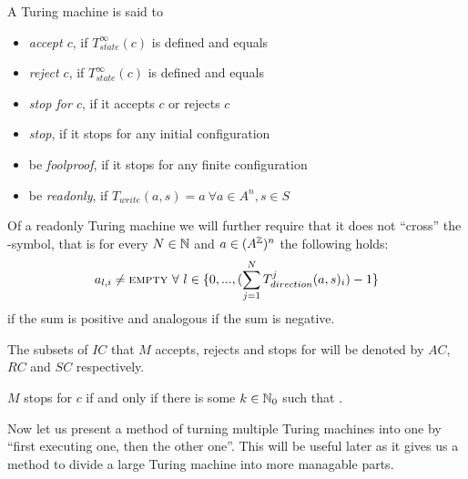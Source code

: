 A Turing machine is said to
\begin{itemize}
	\item{\emph{accept $c$}, if $T_{state}^\infty(c)$ is defined and equals \ACC}
	\item{\emph{reject $c$}, if $T_{state}^\infty(c)$ is defined and equals \REJ}
	\item{\emph{stop for $c$}, if it accepts $c$ or rejects $c$}
	\item{\emph{stop}, if it stops for any initial configuration}
	\item{be \emph{foolproof}, if it stops for any finite configuration}
	\item{be \emph{readonly}, if $T_{write}(a,s) = a~\forall a \in A^n, s \in S$}
\end{itemize}
Of a readonly Turing machine we will further require that it does not ``cross'' the \EMP-symbol, that is for every $N \in \mathbb{N}$ and $a \in (A^{\mathbb{Z}})^n$ the following holds:
\begin{align*}
	a_{l,i} \neq \text{\scshape{empty}}~\forall~l \in \{0,...,(\sum_{j=1}^N T_{direction}^j(a,s)_i) -1\}
\end{align*}
if the sum is positive and analogous if the sum is negative.\footnotemark


The subsets of $IC$ that $M$ accepts, rejects and stops for will be denoted by $AC$, $RC$ and $SC$ respectively.

\begin{Remark}
	$M$ stops for $c$ if and only if there is some $k \in \mathbb{N}_0$ such that .
\end{Remark}

Now let us present a method of turning multiple Turing machines into one by ``first executing one, then the other one''. This will be useful later as it gives us a method to divide a large Turing machine into more managable parts.

